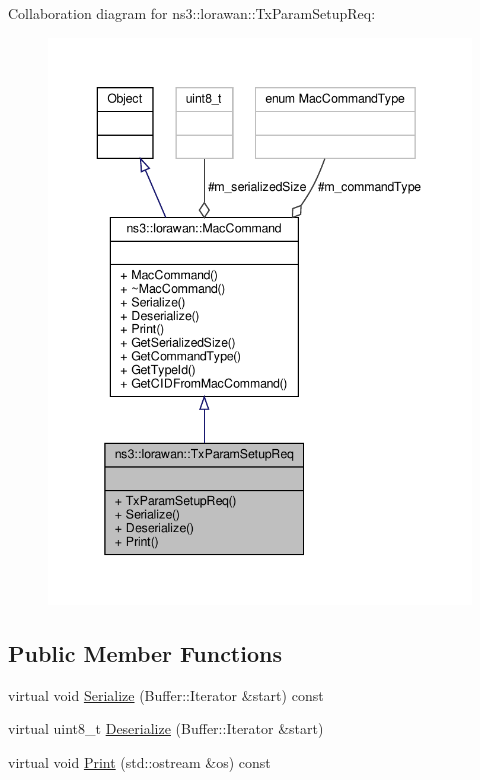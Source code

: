 Collaboration diagram for ns3\+:\+:lorawan\+:\+:Tx\+Param\+Setup\+Req\+:
\nopagebreak
\begin{figure}[H]
\begin{center}
\leavevmode
\includegraphics[width=343pt]{classns3_1_1lorawan_1_1TxParamSetupReq__coll__graph}
\end{center}
\end{figure}
\subsection*{Public Member Functions}
\begin{DoxyCompactItemize}
\item 
virtual void \hyperlink{classns3_1_1lorawan_1_1TxParamSetupReq_a03dd6a1a48962c67b25e17d9799763f4}{Serialize} (Buffer\+::\+Iterator \&start) const
\item 
virtual uint8\+\_\+t \hyperlink{classns3_1_1lorawan_1_1TxParamSetupReq_a2179d7c1a0804bc8a6d42fc638625472}{Deserialize} (Buffer\+::\+Iterator \&start)
\item 
virtual void \hyperlink{classns3_1_1lorawan_1_1TxParamSetupReq_ab4032edd01d5ba3139d3a5896918bf19}{Print} (std\+::ostream \&os) const
\end{DoxyCompactItemize}
